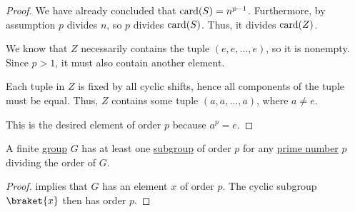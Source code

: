 \begin{proof}
  We have already concluded that \( \operatorname{card}(S) = n^{p-1} \). Furthermore, by assumption \( p \) divides \( n \), so \( p \) divides \( \operatorname{card}(S) \). Thus, it divides \( \operatorname{card}(Z) \).

  We know that \( Z \) necessarily contains the tuple \( (e, e, \ldots, e) \), so it is nonempty. Since \( p > 1 \), it must also contain another element.

  Each tuple in \( Z \) is fixed by all cyclic shifts, hence all components of the tuple must be equal. Thus, \( Z \) contains some tuple \( (a, a, \ldots, a) \), where \( a \neq e \).

  This is the desired element of order \( p \) because \( a^p = e \).
\end{proof}

\begin{corollary}\label{thm:weak_cauchys_subgroup_theorem}
  A finite \hyperref[def:group]{group} \( G \) has at least one \hyperref[def:group/submodel]{subgroup} of order \( p \) for any \hyperref[def:prime_number]{prime number} \( p \) dividing the order of \( G \).
\end{corollary}
\begin{proof}
   implies that \( G \) has an element \( x \) of order \( p \). The cyclic subgroup \( \braket{ x } \) then has order \( p \).
\end{proof}
